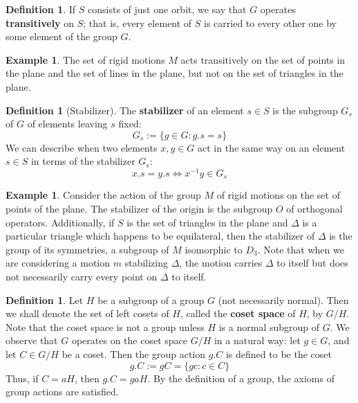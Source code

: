 \documentclass[12pt]{article}
\theoremstyle{definition}
\newtheorem{defn}[thm]{Definition}
\newtheorem{eg}[thm]{Example}
\theoremstyle{remark}
\numberwithin{equation}{section}
\newcommand\B[1]{\textbf{ #1}}
\begin{document}
\begin{defn}
        If $S$ consists of just one orbit, we say that $G$ operates \B{transitively} on $S$; that is, every element of $S$ is carried to every other one by some element of the group $G$.
\end{defn}
\begin{eg}
        The set of rigid motions $M$ acts transitively on the set of points in the plane and the set of lines in the plane, but not on the set of triangles in the plane.
\end{eg}

\vspace{15pt}

\begin{defn}[Stabilizer]
        The \B{stabilizer} of an element $s \in S$ is the subgroup $G_s$ of $G$ of elements leaving $s$ fixed: \begin{equation}
                G_s := \{g \in G: g.s = s\}
        \end{equation}
        We can describe when two elements $x,y \in G$ act in the same way on an element $s \in S$ in terms of the stabilizer $G_s$:\begin{equation}
                x.s = y.s \iff x^{-1}y \in G_s
        \end{equation}
\end{defn}

\vspace{15pt}


\begin{eg}
        Consider the action of the group $M$ of rigid motions on the set of points of the plane. The stabilizer of the origin is the subgroup $O$ of orthogonal operators. Additionally, if $S$ is the set of triangles in the plane and $\Delta$ is a particular triangle which happens to be equilateral, then the stabilizer of $\Delta$ is the group of its symmetries, a subgroup of $M$ isomorphic to $D_3$. Note that when we are considering a motion $m$ stabilizing $\Delta$, the motion carries $\Delta$ to itself but does not necessarily carry every point on $\Delta$ to itself.
\end{eg}

\vspace{15pt}

\begin{defn}
        Let $H$ be a subgroup of a group $G$ (not necessarily normal). Then we shall denote the set of left cosets of $H$, called the \B{coset space} of $H$, by $G/H$. Note that the coset space is not a group unless $H$ is a normal subgroup of $G$. We observe that $G$ operates on the coset space $G/H$ in a natural way: let $g \in G$, and let $C \in G/H$ be a coset. Then the group action $g.C$ is defined to be the coset \begin{equation}
                g.C := gC = \{gc:c \in C\}
        \end{equation}
        Thus, if $C = aH$, then $g.C = gaH$. By the definition of a group, the axioms of group actions are satisfied.
\end{defn}
\end{document}
